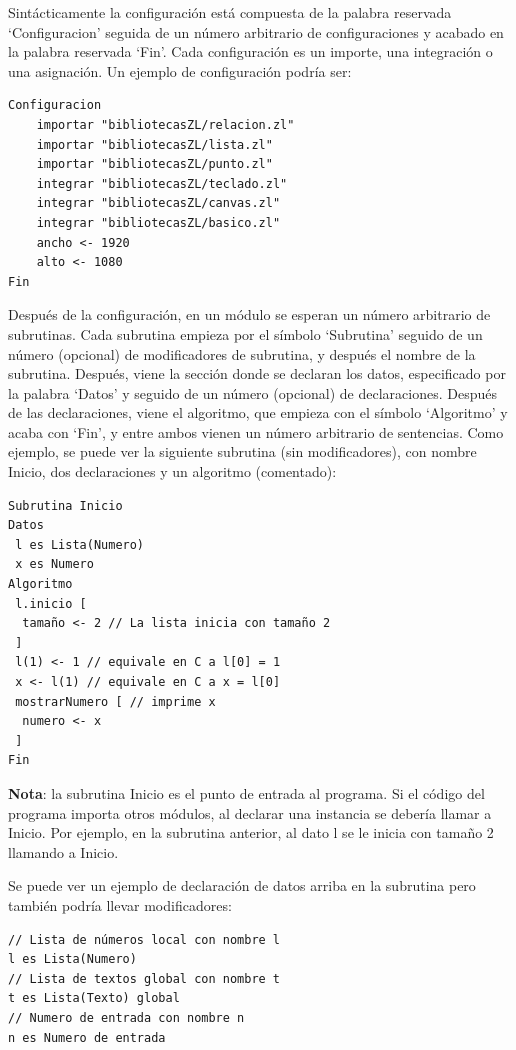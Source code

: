 \documentclass{report}
\begin{document}
	Sintácticamente la configuración está compuesta de la palabra reservada `Configuracion' seguida de un número arbitrario de configuraciones y acabado en la palabra reservada `Fin'. Cada configuración es un importe, una integración o una asignación. Un ejemplo de configuración podría ser:
	
	\begin{BVerbatim}
Configuracion
	importar "bibliotecasZL/relacion.zl"
	importar "bibliotecasZL/lista.zl"
	importar "bibliotecasZL/punto.zl"
	integrar "bibliotecasZL/teclado.zl"
	integrar "bibliotecasZL/canvas.zl"
	integrar "bibliotecasZL/basico.zl"
	ancho <- 1920
	alto <- 1080
Fin
	\end{BVerbatim}
	
	Después de la configuración, en un módulo se esperan un número arbitrario de subrutinas. Cada subrutina empieza por el símbolo `Subrutina' seguido de un número (opcional) de modificadores de subrutina, y después el nombre de la subrutina. Después, viene la sección donde se declaran los datos, especificado por la palabra `Datos' y seguido de un número (opcional) de declaraciones. Después de las declaraciones, viene el algoritmo, que empieza con el símbolo `Algoritmo' y acaba con `Fin', y entre ambos vienen un número arbitrario de sentencias. Como ejemplo, se puede ver la siguiente subrutina (sin modificadores), con nombre Inicio, dos declaraciones y un algoritmo (comentado):
	
	\begin{BVerbatim}
Subrutina Inicio
Datos
 l es Lista(Numero)
 x es Numero
Algoritmo
 l.inicio [ 
  tamaño <- 2 // La lista inicia con tamaño 2
 ]
 l(1) <- 1 // equivale en C a l[0] = 1
 x <- l(1) // equivale en C a x = l[0]
 mostrarNumero [ // imprime x
  numero <- x
 ]
Fin	
	\end{BVerbatim}
	
	\vspace{10px}
	\noindent
	\textbf{Nota}: la subrutina Inicio es el punto de entrada al programa. Si el código del programa importa otros módulos, al declarar una instancia se debería llamar a Inicio. Por ejemplo, en la subrutina anterior, al dato l se le inicia con tamaño 2 llamando a Inicio.
	
	\vspace{10px}
	
	Se puede ver un ejemplo de declaración de datos arriba en la subrutina pero también podría llevar modificadores:
	
	\begin{BVerbatim}
// Lista de números local con nombre l 
l es Lista(Numero)
// Lista de textos global con nombre t
t es Lista(Texto) global
// Numero de entrada con nombre n
n es Numero de entrada
	\end{BVerbatim}
	
\end{document}
